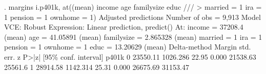. margins i.p401k, at((mean) income age familysize educ   ///
>         married = 1 ira = 1 pension = 1 ownhome = 1)
{\smallskip}
Adjusted predictions                                     Number of obs = 9,913
Model VCE: Robust
{\smallskip}
Expression: Linear prediction, predict()
At: income     =  37208.4 (mean)
    age        = 41.05891 (mean)
    familysize = 2.865328 (mean)
    married    =        1
    ira        =        1
    pension    =        1
    ownhome    =        1
    educ       = 13.20629 (mean)
{\smallskip}
             {\VBAR}            Delta-method
             {\VBAR}     Margin   std. err.      z    P>|z|     [95\% conf. interval]
       p401k {\VBAR}
          0  {\VBAR}   23550.11   1026.286    22.95   0.000     21538.63     25561.6
          1  {\VBAR}   28914.58   1142.314    25.31   0.000     26675.69    31153.47
